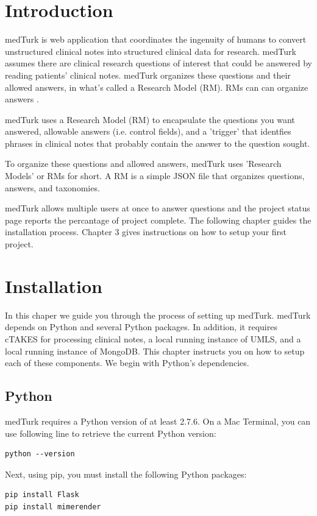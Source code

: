 \documentclass{book}
\begin{document}
\tableofcontents

\mainmatter

\chapter{Introduction}
medTurk is web application that coordinates the ingenuity of humans to convert unstructured clinical notes into structured clinical data for research. medTurk assumes there are clinical research questions of interest that could be answered by reading patients' clinical notes. medTurk organizes these questions and their allowed answers, in what's called a Research Model (RM). RMs can can organize answers .

medTurk uses a Research Model (RM) to encapsulate the questions you want answered, allowable answers (i.e. control fields), and a 'trigger' that identfies phrases in clinical notes that probably contain the answer to the question sought.

To organize these questions and allowed answers, medTurk uses 'Research Models' or RMs for short. A RM is a simple JSON file that organizes questions, answers, and taxonomies.

medTurk allows multiple users at once to answer questions and the project status page reports the percantage of project complete. The following chapter guides the installation process. Chapter 3 gives instructions on how to setup your first project.


\chapter{Installation}
In this chaper we guide you through the process of setting up medTurk. medTurk depends on Python and several Python packages. In addition, it requires cTAKES for processing clinical notes, a local running instance of UMLS, and a local running instance of MongoDB. This chapter instructs you on how to setup each of these components. We begin with Python's dependencies.

\section{Python}
medTurk requires a Python version of at least 2.7.6. On a Mac Terminal, you can use following line to retrieve the current Python version:
\begin{verbatim}
python --version
\end{verbatim}
Next, using pip, you must install the following Python packages:
\begin{verbatim}
pip install Flask
pip install mimerender
\end{verbatim}
\end{document}
